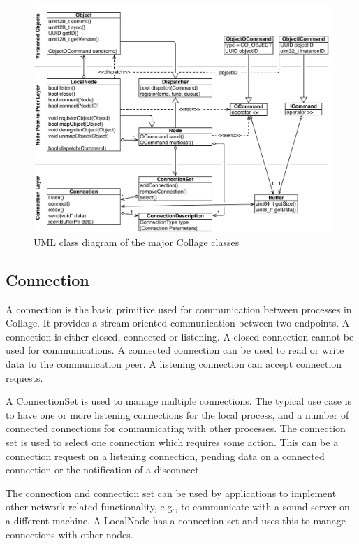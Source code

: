 \begin{figure}[h!t]\center
  \includegraphics[width=\textwidth]{images/collageUML}
  {\caption{\label{fCollageUML}UML class diagram of the major Collage classes}}
\end{figure}

\subsection{Connection}

A connection is the basic primitive used for communication between processes in
Collage. It provides a stream-oriented communication between two endpoints. A
connection is either closed, connected or listening. A closed connection cannot
be used for communications. A connected connection can be used to read or write
data to the communication peer. A listening connection can accept connection
requests.

A \textsf{ConnectionSet} is used to manage multiple connections. The typical use
case is to have one or more listening connections for the local process, and a
number of connected connections for communicating with other processes.
The connection set is used to select one connection which requires some action.
This can be a connection request on a listening connection, pending data on a
connected connection or the notification of a disconnect.

The connection and connection set can be used by applications to implement other
network-related functionality, e.g., to communicate with a sound server on a
different machine. A \textsf{LocalNode} has a connection set and uses this to
manage connections with other nodes.


